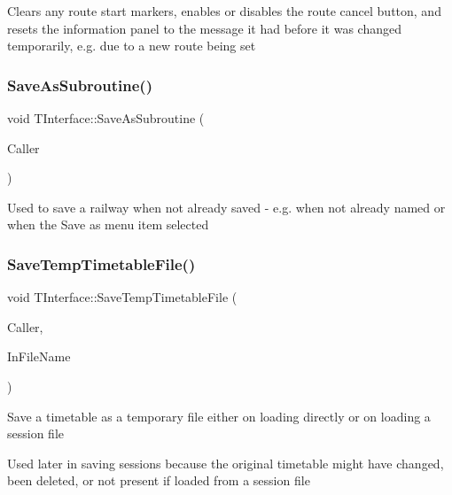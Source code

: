 Clears any route start markers, enables or disables the route cancel button, and resets the information panel to the message it had before it was changed temporarily, e.\+g. due to a new route being set \mbox{\label{class_t_interface_a1b3189e6a50555f5952652d12b978e57}} 
\subsubsection{\texorpdfstring{Save\+As\+Subroutine()}{SaveAsSubroutine()}}
{\footnotesize\ttfamily void T\+Interface\+::\+Save\+As\+Subroutine (\begin{DoxyParamCaption}\item[{int}]{Caller }\end{DoxyParamCaption})\hspace{0.3cm}{\ttfamily [private]}}

Used to save a railway when not already saved -\/ e.\+g. when not already named or when the \textquotesingle{}Save as\textquotesingle{} menu item selected \mbox{\label{class_t_interface_af4c5cddc6749a720766bf875c423fe79}} 
\subsubsection{\texorpdfstring{Save\+Temp\+Timetable\+File()}{SaveTempTimetableFile()}}
{\footnotesize\ttfamily void T\+Interface\+::\+Save\+Temp\+Timetable\+File (\begin{DoxyParamCaption}\item[{int}]{Caller,  }\item[{Ansi\+String}]{In\+File\+Name }\end{DoxyParamCaption})\hspace{0.3cm}{\ttfamily [private]}}

Save a timetable as a temporary file either on loading directly or on loading a session file

Used later in saving sessions because the original timetable might have changed, been deleted, or not present if loaded from a session file \mbox{\label{class_t_interface_a89cc1839f77c2a867714cb52bd8d5cfe}} 

